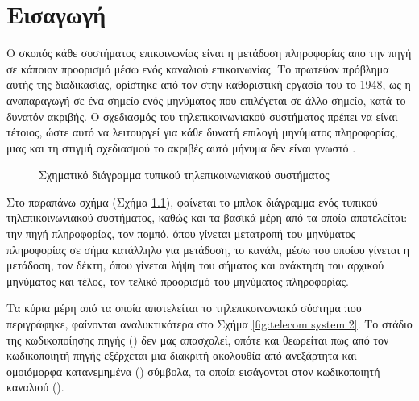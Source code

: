 \chapter{Εισαγωγή}
Ο σκοπός κάθε συστήματος επικοινωνίας είναι η μετάδοση πληροφορίας απο την πηγή σε κάποιον προορισμό μέσω ενός καναλιού επικοινωνίας. Το πρωτεύον πρόβλημα αυτής της διαδικασίας, ορίστηκε από τον  στην καθοριστική εργασία του το 1948, ως η αναπαραγωγή σε ένα σημείο ενός μηνύματος που επιλέγεται σε άλλο σημείο, κατά το δυνατόν ακριβής. Ο σχεδιασμός του τηλεπικοινωνιακού συστήματος πρέπει να είναι τέτοιος, ώστε αυτό να λειτουργεί για κάθε δυνατή επιλογή μηνύματος πληροφορίας, μιας και τη στιγμή σχεδιασμού το ακριβές αυτό μήνυμα δεν είναι γνωστό \cite{shannon1948mathematical}.

\begin{figure}[h]
\caption{Σχηματικό διάγραμμα τυπικού τηλεπικοινωνιακού συστήματος}
\label{fig:telecom system}
\end{figure}

Στο παραπάνω σχήμα (Σχήμα \ref{fig:telecom system}), φαίνεται το μπλοκ διάγραμμα ενός τυπικού τηλεπικοινωνιακού συστήματος, καθώς και τα βασικά μέρη από τα οποία αποτελείται: την πηγή πληροφορίας, τον πομπό, όπου γίνεται μετατροπή του μηνύματος πληροφορίας σε σήμα κατάλληλο για μετάδοση, το κανάλι, μέσω του οποίου γίνεται η μετάδοση, τον δέκτη, όπου γίνεται λήψη του σήματος και ανάκτηση του αρχικού μηνύματος και τέλος, τον τελικό προορισμό του μηνύματος πληροφορίας.

Tα κύρια μέρη από τα οποία αποτελείται το τηλεπικοινωνιακό σύστημα που περιγράφηκε, φαίνονται αναλυκτικότερα στο Σχήμα \ref{fig:telecom system 2}. Tο στάδιο της κωδικοποίησης πηγής () δεν μας απασχολεί, οπότε και θεωρείται πως από τον κωδικοποιητή πηγής εξέρχεται μια διακριτή ακολουθία από ανεξάρτητα και ομοιόμορφα κατανεμημένα () σύμβολα, τα οποία εισάγονται στον κωδικοποιητή καναλιού ().

